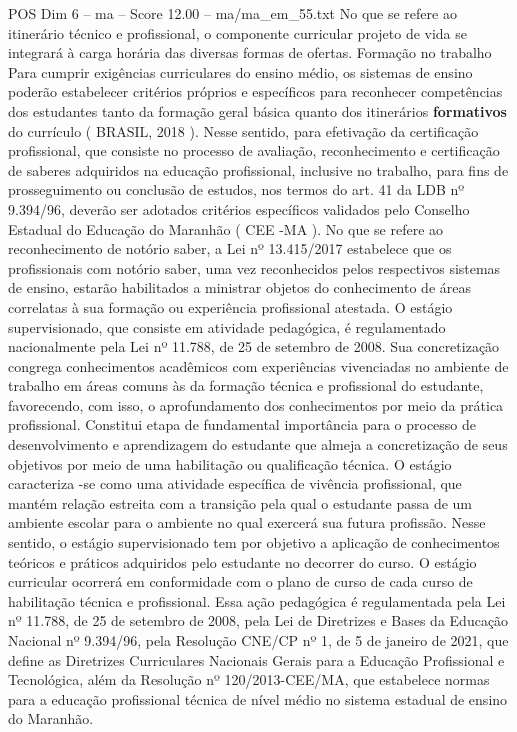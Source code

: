\begin{textsample}{POS Dim 6 – ma – Score 12.00 – ma/ma\_em\_55.txt}
No que se refere ao itinerário técnico e profissional, o componente curricular projeto de vida se integrará à carga horária das diversas formas de ofertas.
Formação no trabalho Para cumprir exigências curriculares do ensino médio, os sistemas de ensino poderão estabelecer critérios próprios e específicos para reconhecer competências dos estudantes tanto da formação geral básica quanto dos itinerários \textbf{formativos} do currículo ( BRASIL, 2018 ).
Nesse sentido, para efetivação da certificação profissional, que consiste no processo de avaliação, reconhecimento e certificação de saberes adquiridos na educação profissional, inclusive no trabalho, para fins de prosseguimento ou conclusão de estudos, nos termos do art. 41 da LDB nº 9.394/96, deverão ser adotados critérios específicos validados pelo Conselho Estadual do Educação do Maranhão ( CEE -MA ).
No que se refere ao reconhecimento de notório saber, a Lei nº 13.415/2017 estabelece que os profissionais com notório saber, uma vez reconhecidos pelos respectivos sistemas de ensino, estarão habilitados a ministrar objetos do conhecimento de áreas correlatas à sua formação ou experiência profissional atestada.
O estágio supervisionado, que consiste em atividade pedagógica, é regulamentado nacionalmente pela Lei nº 11.788, de 25 de setembro de 2008.
Sua concretização congrega conhecimentos acadêmicos com experiências vivenciadas no ambiente de trabalho em áreas comuns às da formação técnica e profissional do estudante, favorecendo, com isso, o aprofundamento dos conhecimentos por meio da prática profissional.
Constitui etapa de fundamental importância para o processo de desenvolvimento e aprendizagem do estudante que almeja a concretização de seus objetivos por meio de uma habilitação ou qualificação técnica.
O estágio caracteriza -se como uma atividade específica de vivência profissional, que mantém relação estreita com a transição pela qual o estudante passa de um ambiente escolar para o ambiente no qual exercerá sua futura profissão.
Nesse sentido, o estágio supervisionado tem por objetivo a aplicação de conhecimentos teóricos e práticos adquiridos pelo estudante no decorrer do curso.
O estágio curricular ocorrerá em conformidade com o plano de curso de cada curso de habilitação técnica e profissional.
Essa ação pedagógica é regulamentada pela Lei nº 11.788, de 25 de setembro de 2008, pela Lei de Diretrizes e Bases da Educação Nacional nº 9.394/96, pela Resolução CNE/CP nº 1, de 5 de janeiro de 2021, que define as Diretrizes Curriculares Nacionais Gerais para a Educação Profissional e Tecnológica, além da Resolução nº 120/2013-CEE/MA, que estabelece normas para a educação profissional técnica de nível médio no sistema estadual de ensino do Maranhão.

\end{textsample}
